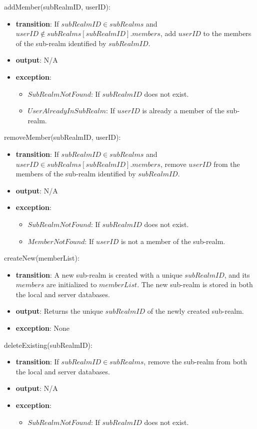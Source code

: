 \documentclass[12pt, titlepage]{article}
\begin{document}
\noindent addMember(subRealmID, userID):
\begin{itemize}
  \item \textbf{transition}:
        If \( subRealmID \in subRealms \) and \( userID \notin subRealms[subRealmID].members \), add \( userID \) to the members of the sub-realm identified by \( subRealmID \).
  \item \textbf{output}: N/A
  \item \textbf{exception}:
        \begin{itemize}
          \item \( SubRealmNotFound \): If \( subRealmID \) does not exist.
          \item \( UserAlreadyInSubRealm \): If \( userID \) is already a member of the sub-realm.
        \end{itemize}
\end{itemize}

\noindent removeMember(subRealmID, userID):
\begin{itemize}
  \item \textbf{transition}:
        If \( subRealmID \in subRealms \) and \( userID \in subRealms[subRealmID].members \), remove \( userID \) from the members of the sub-realm identified by \( subRealmID \).
  \item \textbf{output}: N/A
  \item \textbf{exception}:
        \begin{itemize}
          \item \( SubRealmNotFound \): If \( subRealmID \) does not exist.
          \item \( MemberNotFound \): If \( userID \) is not a member of the sub-realm.
        \end{itemize}
\end{itemize}

\noindent createNew(memberList):
\begin{itemize}
  \item \textbf{transition}:
        A new sub-realm is created with a unique \( subRealmID \), and its \( members \) are initialized to \( memberList \).
        The new sub-realm is stored in both the local and server databases.
  \item \textbf{output}: Returns the unique \( subRealmID \) of the newly created sub-realm.
  \item \textbf{exception}: None
\end{itemize}

\noindent deleteExisting(subRealmID):
\begin{itemize}
  \item \textbf{transition}:
        If \( subRealmID \in subRealms \), remove the sub-realm from both the local and server databases.
  \item \textbf{output}: N/A
  \item \textbf{exception}:
        \begin{itemize}
          \item \( SubRealmNotFound \): If \( subRealmID \) does not exist.
        \end{itemize}
\end{itemize}
\end{document}
